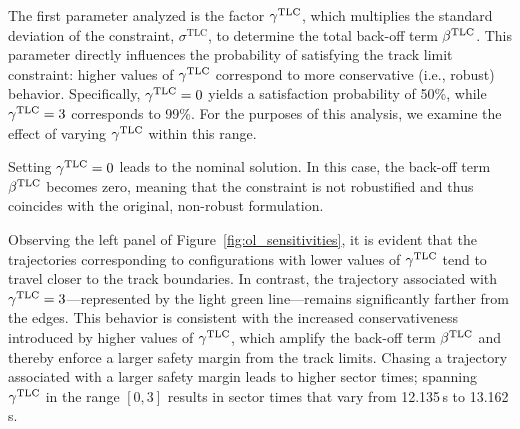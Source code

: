 The first parameter analyzed is the factor $\gamma^\textrm{TLC}$, which multiplies the standard deviation of the constraint, $\sigma^\textrm{TLC}$, to determine the total back-off term $\beta^\textrm{TLC}$. This parameter directly influences the probability of satisfying the track limit constraint: higher values of $\gamma^\textrm{TLC}$ correspond to more conservative (i.e., robust) behavior. Specifically, $\gamma^\textrm{TLC} = 0$ yields a satisfaction probability of 50\%, while $\gamma^\textrm{TLC} = 3$ corresponds to 99\%. For the purposes of this analysis, we examine the effect of varying $\gamma^\textrm{TLC}$ within this range. 

Setting $\gamma^\textrm{TLC} = 0$ leads to the nominal solution. In this case, the back-off term $\beta^\textrm{TLC}$ becomes zero, meaning that the constraint is not robustified and thus coincides with the original, non-robust formulation. 

Observing the left panel of Figure~\ref{fig:ol_sensitivities}, it is evident that the trajectories corresponding to configurations with lower values of $\gamma^\textrm{TLC}$ tend to travel closer to the track boundaries. In contrast, the trajectory associated with $\gamma^\textrm{TLC} = 3$---represented by the light green line---remains significantly farther from the edges.
This behavior is consistent with the increased conservativeness introduced by higher values of $\gamma^\textrm{TLC}$, which amplify the back-off term $\beta^\textrm{TLC}$ and thereby enforce a larger safety margin from the track limits.
Chasing a trajectory associated with a larger safety margin leads to higher sector times; spanning $\gamma^\textrm{TLC}$ in the range $\left[0,3\right]$ results in sector times that vary from 12.135\,s to 13.162\,s.

